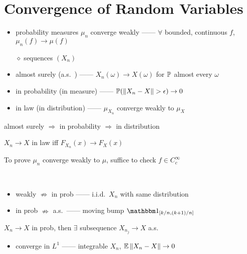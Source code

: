 \section{Convergence of Random Variables}\label{sec:convergence-of-random-variables}

\begin{itemize}
    \item probability measures $\mu_n$ converge weakly ------ $\forall$ bounded, continuous $f$, $\mu_n(f) \rightarrow \mu(f)$
    \item[$\diamond$] sequences $(X_n)$
    \item almost surely (a.s.\ ) ------ $X_n(\omega) \rightarrow X(\omega)$ for $\mathbb{P}$ almost every $\omega$
    \item in probability (in measure) ------ $\mathbb{P}(\left\lVert X_n - X\right\rVert > \epsilon) \rightarrow 0$
    \item in law (in distribution) ------ $\mu_{X_n}$ converge weakly to $\mu_X$
\end{itemize}

\begin{prop}
    almost surely $\Rightarrow$ in probability $\Rightarrow$ in distribution
\end{prop}

\begin{fact}
    $X_n \rightarrow X$ in law iff $F_{X_n}(x) \rightarrow F_{X}(x)$
\end{fact}

\begin{fact}
    To prove $\mu_n$ converge weakly to $\mu$, suffice to check $f \in C^\infty_c$
\end{fact}

\begin{counterexample}\,
    \begin{itemize}
        \item weakly $\nRightarrow$ in prob ------ i.i.d.\ $X_n$ with same distribution
        \item in prob $\nRightarrow$ a.s.\  ------ moving bump $\In_{[k/n, (k+1)/n]}$
    \end{itemize}
\end{counterexample}

\begin{prop}
    $X_n \rightarrow X$ in prob, then $\exists$ subsequence $X_{n_j} \rightarrow X$ a.s.
\end{prop}

\begin{itemize}
    \item converge in $L^1$ ------ integrable $X_n$, $\mathbb{E} \left\lVert X_n - X\right\rVert \rightarrow 0$
\end{itemize}

